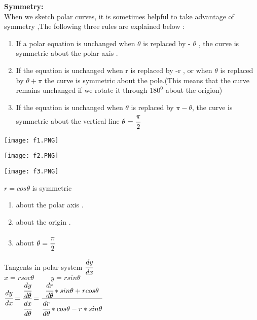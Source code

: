 \noindent{\color{smalt(darkpowderblue)}\rule{\linewidth}{.2mm}}
{\Large\textbf{Symmetry:}}\\
When we sketch polar curves, it is sometimes helpful to take advantage of symmetry ,The following three rules are explained below : 
\begin{enumerate}
    \item If a polar equation is unchanged when $\theta$ is replaced by - $\theta$ , the curve is symmetric about the polar axis .
    \item If the equation is unchanged when r is replaced by -r , or when $\theta$ is replaced by $\theta+\pi$ the curve is symmetric about the pole.(This means that the 
    curve remains unchanged if we rotate it through $180^0$ about the origion)
    \item If the equation is unchanged when $\theta$ is replaced by $\pi-\theta$, the curve is symmetric about the vertical line $\theta=\cfrac{\pi}{2}$
\end{enumerate}
\begin{minipage}{0.3\textwidth}
\texttt{[image: f1.PNG]}
\end{minipage}
\begin{minipage}{.3\textwidth}
\texttt{[image: f2.PNG]}
\end{minipage}
\hfill
\begin{minipage}{.3\textwidth}
\texttt{[image: f3.PNG]}
\end{minipage}
\noindent{\color{smalt(darkpowderblue)}\rule{\linewidth}{.2mm}}
\begin{example}
$r=cos\theta$ is symmetric  
\begin{enumerate}
    \item about the polar axis .
    \item about the origin .
    \item about $\theta=\cfrac{\pi}{2}$
\end{enumerate}
\end{example}
\noindent{\color{smalt(darkpowderblue)}\rule{\linewidth}{.2mm}}
Tangents in polar system $\cfrac{dy}{dx}$ \\
$x=rsoc\theta \hspace{1cm} y=rsin\theta$ \\
$\cfrac{dy}{dx}= \cfrac{\cfrac{dy}{d\theta}}{\cfrac{dx}{d\theta}}= \cfrac{\cfrac{dr}{d\theta}*sin\theta+rcos\theta}{\cfrac{dr}{d\theta}*cos\theta-r*sin\theta}$ \\
